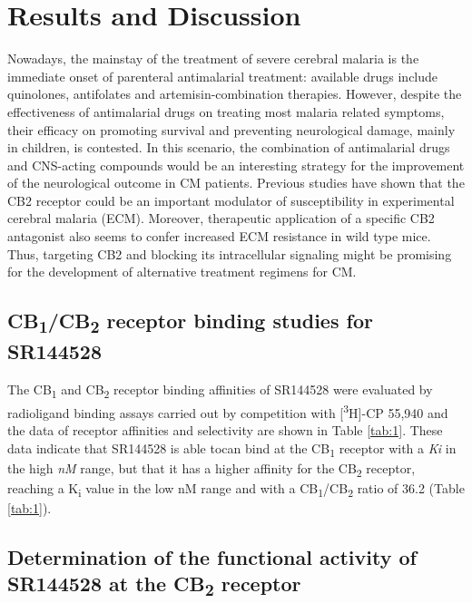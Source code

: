 \documentclass[empirical, authordate]{jote-new-article}
\begin{document}
\section{Results and Discussion}

\begin{originalPurpose}
  Nowadays, the mainstay of the treatment of severe cerebral malaria is the immediate onset of parenteral antimalarial treatment: available drugs include quinolones, antifolates and artemisin-combination therapies. However, despite the effectiveness of antimalarial drugs on treating most malaria related symptoms, their efficacy on promoting survival and preventing neurological damage, mainly in children, is contested. In this scenario, the combination of antimalarial drugs and CNS-acting compounds would be an interesting strategy for the improvement of the neurological outcome in CM patients. Previous studies have shown that the CB2 receptor could be an important modulator of susceptibility in experimental cerebral malaria (ECM). Moreover, therapeutic application of a specific CB2 antagonist also seems to confer increased ECM resistance in wild type mice. Thus, targeting CB2 and blocking its intracellular signaling might be promising for the development of alternative treatment regimens for CM.
\end{originalPurpose}

\subsection{CB\textsubscript{1}/CB\textsubscript{2} receptor binding studies for SR144528}

The CB\textsubscript{1} and CB\textsubscript{2} receptor binding affinities of SR144528 were evaluated by radioligand binding assays carried out by competition with [\textsuperscript{3}H]-CP 55,940 and the data of receptor affinities and selectivity are shown in Table \ref{tab:1}. These data indicate that SR144528 is able tocan bind at the CB\textsubscript{1} receptor with a \emph{Ki} in the high \emph{nM} range, but that it has a higher affinity for the CB\textsubscript{2} receptor, reaching a K\textsubscript{i} value in the low nM range and with a CB\textsubscript{1}/CB\textsubscript{2} ratio of 36.2 (Table \ref{tab:1}).






\subsection{Determination of the functional activity of SR144528 at the CB\textsubscript{2} receptor}
\end{document}
